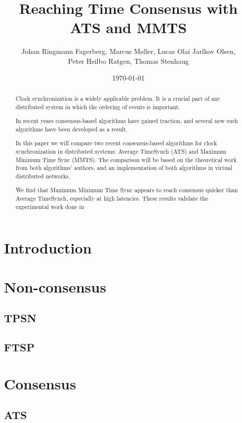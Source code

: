 \documentclass{sciposter}
\title{Reaching Time Consensus with ATS and MMTS}
\date{\today}
\author{Johan Ringmann Fagerberg, Marcus Møller, Lucas Olai Jarlkov Olsen,\\
  Peter Heilbo Ratgen, Thomas Stenhaug}
\institute{Institut for Matematik og Datalogi\\
            Syddansk Universitet}
\begin{document}
\maketitle

\begin{multicols}{3}

\begin{abstract}
Clock synchronization is a widely applicable problem. It is a crucial part of any distributed system in which the ordering of events is important.

In recent years consensus-based algorithms have gained traction, and several new such algorithms have been developed as a result.

In this paper we will compare two recent consensus-based algorithms for clock synchronization in distributed systems: Average TimeSynch (ATS) and Maximum Minimum Time Sync (MMTS). The comparison will be based on the theoretical work from both algorithms' authors, and an implementation of both algorithms in virtual distributed networks.

We find that Maximum Minimum Time Sync appears to reach consensus quicker than Average TimeSynch, especially at high latencies. These results validate the experimental work done in %
\end{abstract}

\section{Introduction}

\lipsum[5]

\section{Non-consensus}

\subsection{TPSN}

\subsection{FTSP}

\section{Consensus}

\subsection{ATS}


\end{multicols}
\end{document}
